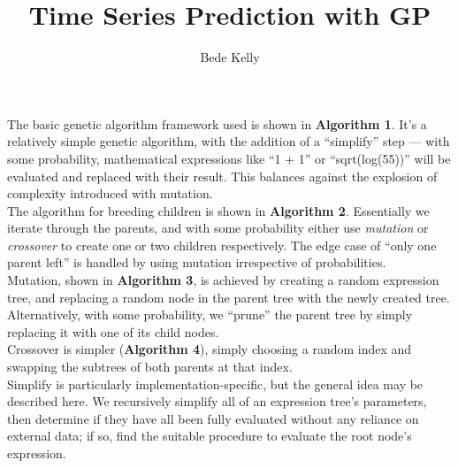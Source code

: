 \documentclass[11pt]{article}
\begin{document}
 \title{Time Series Prediction with GP}
 \author{Bede Kelly}
 \maketitle

The basic genetic algorithm framework used is shown in \textbf{Algorithm 1}. It's a relatively simple genetic algorithm, with the addition of a ``simplify'' step --- with some probability, mathematical expressions like ``1 + 1'' or ``sqrt(log(55))'' will be evaluated and replaced with their result. This balances against the explosion of complexity introduced with mutation.\\

The algorithm for breeding children is shown in \textbf{Algorithm 2}. Essentially we iterate through the parents, and with some probability either use \textit{mutation} or \textit{crossover} to create one or two children respectively. The edge case of ``only one parent left'' is handled by using mutation irrespective of probabilities.\\

Mutation, shown in \textbf{Algorithm 3}, is achieved by creating a random expression tree, and replacing a random node in the parent tree with the newly created tree. Alternatively, with some probability, we ``prune'' the parent tree by simply replacing it with one of its child nodes.\\

Crossover is simpler (\textbf{Algorithm 4}), simply choosing a random index and swapping the subtrees of both parents at that index.\\

Simplify is particularly implementation-specific, but the general idea may be described here. We recursively simplify all of an expression tree's parameters, then determine if they have all been fully evaluated without any reliance on external data; if so, find the suitable procedure to evaluate the root node's expression.

\pagebreak
\end{document}
